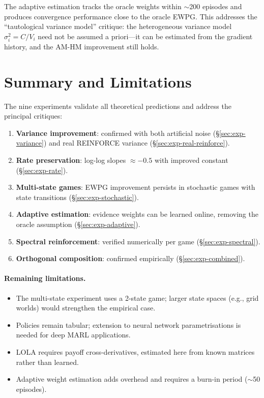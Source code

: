 The adaptive estimation tracks the oracle weights within $\sim$200 episodes and produces convergence performance close to the oracle EWPG. This addresses the ``tautological variance model'' critique: the heterogeneous variance model $\sigma_i^2 = C/V_i$ need not be assumed a priori---it can be estimated from the gradient history, and the AM-HM improvement still holds.


\section{Summary and Limitations}
\label{sec:exp-summary}

The nine experiments validate all theoretical predictions and address the principal critiques:

\begin{enumerate}
    \item \textbf{Variance improvement}: confirmed with both artificial noise (\S\ref{sec:exp-variance}) and real REINFORCE variance (\S\ref{sec:exp-real-reinforce}).
    \item \textbf{Rate preservation}: log-log slopes $\approx -0.5$ with improved constant (\S\ref{sec:exp-rate}).
    \item \textbf{Multi-state games}: EWPG improvement persists in stochastic games with state transitions (\S\ref{sec:exp-stochastic}).
    \item \textbf{Adaptive estimation}: evidence weights can be learned online, removing the oracle assumption (\S\ref{sec:exp-adaptive}).
    \item \textbf{Spectral reinforcement}: verified numerically per game (\S\ref{sec:exp-spectral}).
    \item \textbf{Orthogonal composition}: confirmed empirically (\S\ref{sec:exp-combined}).
\end{enumerate}

\paragraph{Remaining limitations.}
\begin{itemize}
    \item The multi-state experiment uses a 2-state game; larger state spaces (e.g., grid worlds) would strengthen the empirical case.
    \item Policies remain tabular; extension to neural network parametrisations is needed for deep MARL applications.
    \item LOLA requires payoff cross-derivatives, estimated here from known matrices rather than learned.
    \item Adaptive weight estimation adds overhead and requires a burn-in period ($\sim$50 episodes).
\end{itemize}
